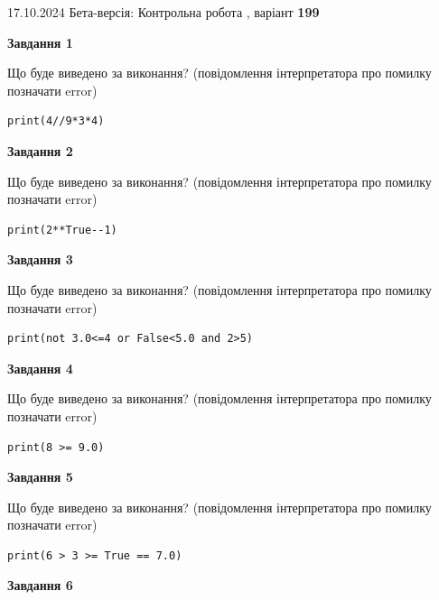 \documentclass[12pt, ukrainian]{article}
\begin{document}
{\Large{17.10.2024 Бета-версія: Контрольна робота , варіант  \No \textbf { 199 }\par}}
{
\begin {large}
{\begin {center}\textbf{Завдання 1}\end {center}}

Що буде виведено за виконання? (повідомлення інтерпретатора про помилку позначати error)\par
\begin{verbatim}
print(4//9*3*4)
\end{verbatim}

{\begin {center}\textbf{Завдання 2}\end {center}}

Що буде виведено за виконання? (повідомлення інтерпретатора про помилку позначати error)\par
\begin{verbatim}
print(2**True--1)
\end{verbatim}

{\begin {center}\textbf{Завдання 3}\end {center}}

Що буде виведено за виконання? (повідомлення інтерпретатора про помилку позначати error)\par
\begin{verbatim}
print(not 3.0<=4 or False<5.0 and 2>5)
\end{verbatim}

{\begin {center}\textbf{Завдання 4}\end {center}}

Що буде виведено за виконання? (повідомлення інтерпретатора про помилку позначати error)\par
\begin{verbatim}
print(8 >= 9.0)
\end{verbatim}

{\begin {center}\textbf{Завдання 5}\end {center}}

Що буде виведено за виконання? (повідомлення інтерпретатора про помилку позначати error)\par
\begin{verbatim}
print(6 > 3 >= True == 7.0)
\end{verbatim}

{\begin {center}\textbf{Завдання 6}\end {center}}


\end{large}}
\end{document}
